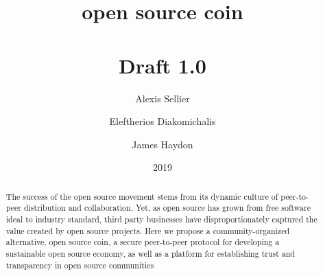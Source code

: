 \documentclass[a4paper, oneside, 10pt, draft]{amsart}
\begin{document}
\title[open source coin]{open source coin \\ \vspace{0.5em} \\ {\tiny Draft 1.0}}
\author{\Small Alexis Sellier}
\address{\normalfont \texttt{alexis@monadic.xyz}}
\author{\Small Eleftherios Diakomichalis}
\address{\normalfont \texttt{ele@monadic.xyz}}
\author{\Small James Haydon}
\address{\normalfont \texttt{james@monadic.xyz}}
\date{2019}

\begin{abstract}
The success of the open source movement stems from its dynamic culture of
peer-to-peer distribution and collaboration. Yet, as open source has grown from
free software ideal to industry standard, third party businesses have
disproportionately captured the value created by open source projects. Here we
propose a community-organized alternative, open source coin, a secure
peer-to-peer protocol for developing a sustainable open source economy, as well
as a platform for establishing trust and transparency in open source
communities
\end{abstract}

\maketitle
\end{document}

